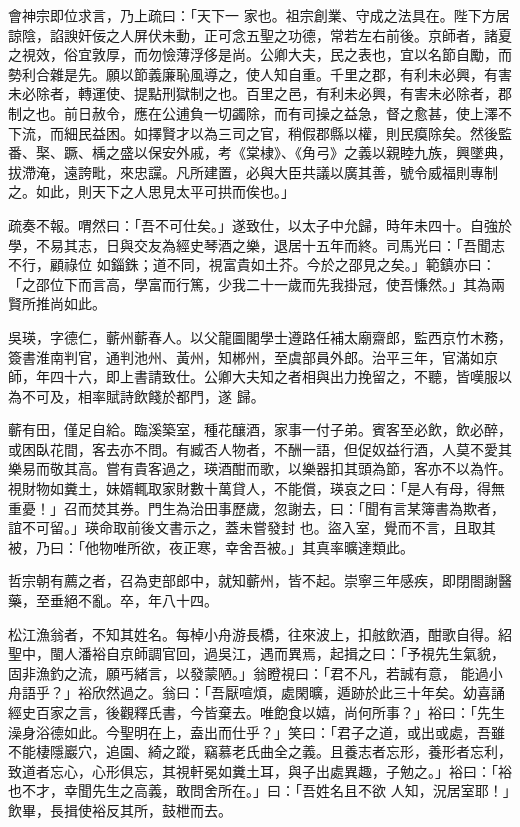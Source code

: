\begin{pinyinscope}
 會神宗即位求言，乃上疏曰：「天下一
 家也。祖宗創業、守成之法具在。陛下方居諒陰，諂諛奸佞之人屏伏未動，正可念五聖之功德，常若左右前後。京師者，諸夏之視效，俗宜敦厚，而勿憸薄浮侈是尚。公卿大夫，民之表也，宜以名節自勵，而勢利合雜是先。願以節義廉恥風導之，使人知自重。千里之郡，有利未必興，有害未必除者，轉運使、提點刑獄制之也。百里之邑，有利未必興，有害未必除者，郡制之也。前日赦令，應在公逋負一切蠲除，而有司操之益急，督之愈甚，使上澤不
 下流，而細民益困。如擇賢才以為三司之官，稍假郡縣以權，則民瘼除矣。然後監番、棸、蹶、楀之盛以保安外戚，考《棠棣》、《角弓》之義以親睦九族，興墜典，拔滯淹，遠誇毗，來忠讜。凡所建置，必與大臣共議以廣其善，號令威福則專制之。如此，則天下之人思見太平可拱而俟也。」



 疏奏不報。喟然曰：「吾不可仕矣。」遂致仕，以太子中允歸，時年未四十。自強於學，不易其志，日與交友為經史琴酒之樂，退居十五年而終。司馬光曰：「吾聞志不行，顧祿位
 如錙銖；道不同，視富貴如土芥。今於之邵見之矣。」範鎮亦曰：「之邵位下而言高，學富而行篤，少我二十一歲而先我掛冠，使吾慊然。」其為兩賢所推尚如此。



 吳瑛，字德仁，蘄州蘄春人。以父龍圖閣學士遵路任補太廟齋郎，監西京竹木務，簽書淮南判官，通判池州、黃州，知郴州，至虞部員外郎。治平三年，官滿如京師，年四十六，即上書請致仕。公卿大夫知之者相與出力挽留之，不聽，皆嘆服以為不可及，相率賦詩飲餞於都門，遂
 歸。



 蘄有田，僅足自給。臨溪築室，種花釀酒，家事一付子弟。賓客至必飲，飲必醉，或困臥花間，客去亦不問。有臧否人物者，不酬一語，但促奴益行酒，人莫不愛其樂易而敬其高。嘗有貴客過之，瑛酒酣而歌，以樂器扣其頭為節，客亦不以為忤。視財物如糞土，妹婿輒取家財數十萬貸人，不能償，瑛哀之曰：「是人有母，得無重憂！」召而焚其券。門生為治田事歷歲，忽謝去，曰：「聞有言某簿書為欺者，誼不可留。」瑛命取前後文書示之，蓋未嘗發封
 也。盜入室，覺而不言，且取其被，乃曰：「他物唯所欲，夜正寒，幸舍吾被。」其真率曠達類此。



 哲宗朝有薦之者，召為吏部郎中，就知蘄州，皆不起。崇寧三年感疾，即閉閤謝醫藥，至垂絕不亂。卒，年八十四。



 松江漁翁者，不知其姓名。每棹小舟游長橋，往來波上，扣舷飲酒，酣歌自得。紹聖中，閩人潘裕自京師調官回，過吳江，遇而異焉，起揖之曰：「予視先生氣貌，固非漁釣之流，願丐緒言，以發蒙陋。」翁瞪視曰：「君不凡，若誠有意，
 能過小舟語乎？」裕欣然過之。翁曰：「吾厭喧煩，處閑曠，遁跡於此三十年矣。幼喜誦經史百家之言，後觀釋氏書，今皆棄去。唯飽食以嬉，尚何所事？」裕曰：「先生澡身浴德如此。今聖明在上，盍出而仕乎？」笑曰：「君子之道，或出或處，吾雖不能棲隱巖穴，追園、綺之蹤，竊慕老氏曲全之義。且養志者忘形，養形者忘利，致道者忘心，心形俱忘，其視軒冕如糞土耳，與子出處異趣，子勉之。」裕曰：「裕也不才，幸聞先生之高義，敢問舍所在。」曰：「吾姓名且不欲
 人知，況居室耶！」飲畢，長揖使裕反其所，鼓枻而去。




\end{pinyinscope}
